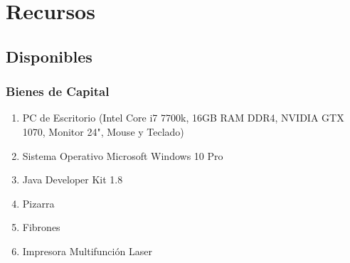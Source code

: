 \documentclass[a4paper, 10pt, oneside]{book}
\begin{document}

    \section{Recursos}\label{sec:recursos}
    \subsection{Disponibles}\label{subsec:recursosDisponibles}

    \subsubsection{Bienes de Capital}

    \begin{enumerate}
        \item PC de Escritorio (Intel Core i7 7700k, 16GB RAM DDR4, NVIDIA GTX 1070, Monitor 24", Mouse y Teclado)
        \item Sistema Operativo Microsoft Windows 10 Pro
        \item Java Developer Kit 1.8
        \item Pizarra
        \item Fibrones
        \item Impresora Multifunción Laser
    \end{enumerate}
\end{document}
